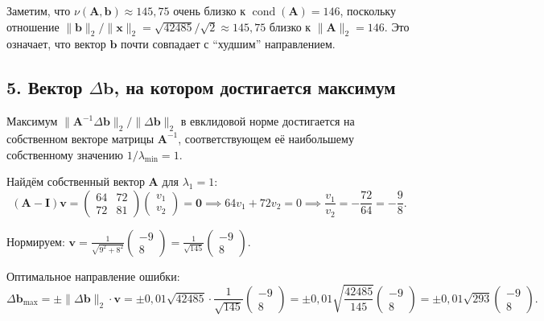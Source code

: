 \documentclass{article}
\begin{document}
Заметим, что $\nu(\mathbf{A}, \mathbf{b}) \approx 145{,}75$ очень близко к $\operatorname{cond}(\mathbf{A}) = 146$, поскольку отношение $\|\mathbf{b}\|_2/\|\mathbf{x}\|_2 = \sqrt{42485}/\sqrt{2} \approx 145{,}75$ близко к $\|\mathbf{A}\|_2 = 146$. Это означает, что вектор $\mathbf{b}$ почти совпадает с ``худшим'' направлением.

\subsection*{5. Вектор $\Delta\mathbf{b}$, на котором достигается максимум}

Максимум $\|\mathbf{A}^{-1}\Delta\mathbf{b}\|_2/\|\Delta\mathbf{b}\|_2$ в евклидовой норме достигается на собственном векторе матрицы $\mathbf{A}^{-1}$, соответствующем её наибольшему собственному значению $1/\lambda_{\min} = 1$.

Найдём собственный вектор $\mathbf{A}$ для $\lambda_1 = 1$:
\begin{equation}
(\mathbf{A} - \mathbf{I})\mathbf{v} = \begin{pmatrix} 64 & 72 \\ 72 & 81 \end{pmatrix} \begin{pmatrix} v_1 \\ v_2 \end{pmatrix} = \mathbf{0} \implies 64v_1 + 72v_2 = 0 \implies \frac{v_1}{v_2} = -\frac{72}{64} = -\frac{9}{8}.
\end{equation}

Нормируем: $\mathbf{v} = \frac{1}{\sqrt{9^2 + 8^2}} \begin{pmatrix} -9 \\ 8 \end{pmatrix} = \frac{1}{\sqrt{145}} \begin{pmatrix} -9 \\ 8 \end{pmatrix}$.

Оптимальное направление ошибки:
\begin{equation}
\Delta\mathbf{b}_{\max} = \pm \|\Delta\mathbf{b}\|_2 \cdot \mathbf{v} = \pm 0{,}01\sqrt{42485} \cdot \frac{1}{\sqrt{145}} \begin{pmatrix} -9 \\ 8 \end{pmatrix} = \pm 0{,}01\sqrt{\frac{42485}{145}} \begin{pmatrix} -9 \\ 8 \end{pmatrix} = \pm 0{,}01\sqrt{293} \begin{pmatrix} -9 \\ 8 \end{pmatrix}.
\end{equation}
\end{document}
